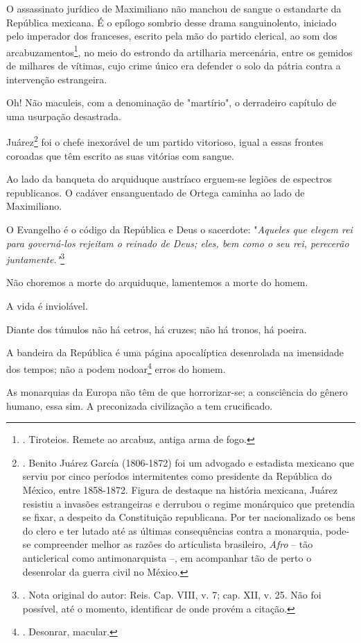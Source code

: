 O assassinato jurídico de Maximiliano não manchou de sangue o estandarte
da República mexicana. É o epílogo sombrio desse drama sanguinolento,
iniciado pelo imperador dos franceses, escrito pela mão do partido
clerical, ao som dos arcabuzamentos\footnote{. Tiroteios. Remete ao
  arcabuz, antiga arma de fogo.}, no meio do estrondo da artilharia
mercenária, entre os gemidos de milhares de vítimas, cujo crime único
era defender o solo da pátria contra a intervenção estrangeira.

Oh! Não maculeis, com a denominação de "martírio", o derradeiro capítulo
de uma usurpação desastrada.

Juárez\footnote{. Benito Juárez García (1806-1872) foi um advogado e
  estadista mexicano que serviu por cinco períodos intermitentes como
  presidente da República do México, entre 1858-1872. Figura de destaque
  na história mexicana, Juárez resistiu a invasões estrangeiras e
  derrubou o regime monárquico que pretendia se fixar, a despeito da
  Constituição republicana. Por ter nacionalizado os bens do clero e ter
  lutado até as últimas consequências contra a monarquia, pode-se
  compreender melhor as razões do articulista brasileiro, \emph{Afro} --
  tão anticlerical como antimonarquista --, em acompanhar tão de perto o
  desenrolar da guerra civil no México.} foi o chefe inexorável de um
partido vitorioso, igual a essas frontes coroadas que têm escrito as
suas vitórias com sangue.

Ao lado da banqueta do arquiduque austríaco erguem-se legiões de
espectros republicanos. O cadáver ensanguentado de Ortega caminha ao
lado de Maximiliano.

O Evangelho é o código da República e Deus o sacerdote: "\emph{Aqueles
que elegem rei para governá-los rejeitam o reinado de Deus; eles, bem
como o seu rei, perecerão juntamente."}\footnote{. Nota original do
  autor: Reis. Cap. VIII, v. 7; cap. XII, v. 25. Não foi possível, até o
  momento, identificar de onde provém a citação.}

Não choremos a morte do arquiduque, lamentemos a morte do homem.

A vida é inviolável.

Diante dos túmulos não há cetros, há cruzes; não há tronos, há poeira.

A bandeira da República é uma página apocalíptica desenrolada na
imensidade dos tempos; não a podem nodoar\footnote{. Desonrar, macular.}
erros do homem.

As monarquias da Europa não têm de que horrorizar-se; a consciência do
gênero humano, essa sim. A preconizada civilização a tem crucificado.

